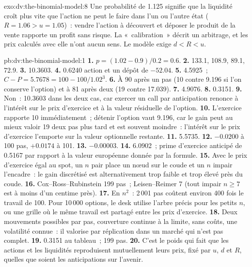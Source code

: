 \begin{solution}{exo:dv:the-binomial-model:8}
Une probabilité de 1.125 signifie que la liquidité croît plus vite que l'action ne peut le faire dans
l'un ou l'autre état ($R=1.06>u=1.05$)~: vendre l'action à découvert et déposer le produit de la vente rapporte un
profit sans risque. La «~calibration~» décrit un arbitrage, et les prix calculés
avec elle n'ont aucun sens. Le modèle exige $d<R<u$.
\end{solution}

\begin{solution}{pb:dv:the-binomial-model:1}
\textbf{1.} $p=(1.02-0.9)/0.2=0.6$.
\textbf{2.} 133.1, 108.9, 89.1, 72.9.
\textbf{3.} 10.3603.
\textbf{4.} 0.6240 action et un dépôt de $-52.04$.
\textbf{5.} 4.5925~; $C-P=5.7678=100-100/1.02^3$.
\textbf{6.} À 90 après un pas (10 contre 9.196 si l'on conserve l'option) et à 81 après deux (19
contre 17.039).
\textbf{7.} 4.9076.
\textbf{8.} 0.3151.
\textbf{9.} Non~: 10.3603 dans les deux cas, car exercer un call par anticipation renonce à l'intérêt
sur le prix d'exercice et à la valeur résiduelle de l'option.
\textbf{10.} L'exercice rapporte 10 immédiatement~; détenir l'option vaut 9.196, car le gain
peut au mieux valoir 19 deux pas plus tard et est souvent moindre~: l'intérêt sur le
prix d'exercice l'emporte sur la valeur optionnelle restante.
\textbf{11.} 5.5735.
\textbf{12.} $-0.0200$ à 100 pas, $+0.0174$ à 101.
\textbf{13.} $-0.00003$.
\textbf{14.} 6.0902~; prime d'exercice anticipé de 0.5167 par rapport à la valeur européenne donnée par la formule.
\textbf{15.} Avec le prix d'exercice égal au spot, un $n$ pair place un nœud sur le coude et un $n$ impair
l'encadre~: le gain discrétisé est alternativement trop faible et trop élevé près
du coude.
\textbf{16.} Cox--Ross--Rubinstein 199 pas~; Leisen--Reimer 7 (tout impair $n\ge7$
est à moins d'un centime près).
\textbf{17.} En $n^2$~: 2\,001 pas coûtent environ 400 fois le travail de 100. Pour
10\,000 options, le desk utilise l'arbre précis pour les petits $n$, ou une grille
où le même travail est partagé entre les prix d'exercice.
\textbf{18.} Deux mouvements possibles par pas, couverture continue à la limite, sans
coûts, une volatilité connue~: il valorise par réplication dans un marché qui n'est pas
complet.
\textbf{19.} 0.3151 au tableau~; 199 pas.
\textbf{20.} C'est le poids qui fait que les actions et les liquidités reproduisent mutuellement
leurs prix, fixé par $u$, $d$ et $R$, quelles que soient les anticipations sur l'avenir.
\end{solution}

